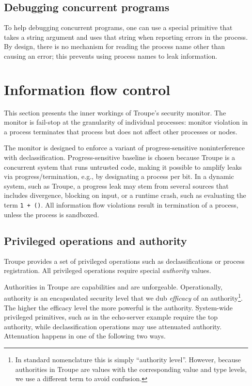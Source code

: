 \subsection{Debugging concurrent programs}
To help debugging concurrent programs, one can use a special primitive  that
takes a string argument and uses that string when reporting errors in the process. By design, there is no mechanism
for reading the process name other than causing an error; this prevents using process names to leak information.


\section{Information flow control}
\label{sec:infoflow}

This section presents the inner workings of Troupe's security monitor. The monitor is fail-stop at the granularity of individual processes: monitor violation in a process terminates that process but does not affect other processes or nodes.

The monitor is designed to enforce a variant of progress-sen\-si\-tive
noninterference with declassification. Progress-sensitive baseline is chosen because Troupe is a concurrent system that runs untrusted code, making it possible to amplify leaks via progress/termination, e.g., by designating a process per bit.
%
In a dynamic system, such as Troupe, a progress leak may stem from several sources that includes divergence, blocking on input, or a runtime crash, such as evaluating the term {\tt 1 + ()}.
%
%
All information flow violations result in termination of a process,
unless the process is sandboxed.


\subsection{Privileged operations and authority}
\label{sec:infoflow:authority}

Troupe provides a set of privileged operations
such as declassifications or process registration. All privileged operations require special \emph{authority} values.

Authorities in Troupe are capabilities and are unforgeable.
Operationally, authority is an encapsulated security level that we dub  \emph{efficacy} of an authority\footnote{In standard nomenclature this is simply ``authority level''. However, because authorities in Troupe are values with the corresponding value and type levels, we use a different term to avoid confusion.}. The higher the efficacy level the more powerful is the authority.
%
System-wide privileged primitives, such as  in the echo-server example require the top authority, while  declassification operations may use attenuated authority. Attenuation happens in one of the following two ways.
\label{sec:io:check}


